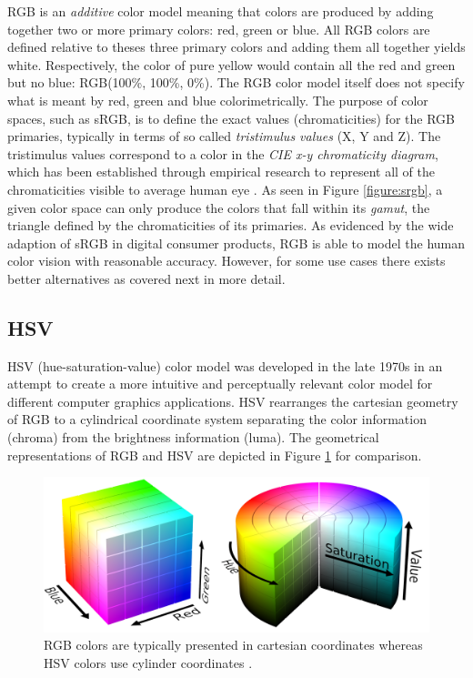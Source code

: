 \documentclass[thesis.tex]{subfiles}
\begin{document}
RGB is an \textit{additive} color model meaning that colors are produced by adding together two or more primary colors: red, green or blue. All RGB colors are defined relative to theses three primary colors and adding them all together yields white. Respectively, the color of pure yellow would contain all the red and green but no blue: RGB(100\%, 100\%, 0\%). The RGB color model itself does not specify what is meant by red, green and blue colorimetrically. The purpose of color spaces, such as sRGB, is to define the exact values (chromaticities) for the RGB primaries, typically in terms of so called \textit{tristimulus values} (X, Y and Z). The tristimulus values correspond to a color in the \textit{CIE x-y chromaticity diagram}, which has been established through empirical research to represent all of the chromaticities visible to average human eye \cite{cie}. As seen in Figure \ref{figure:srgb}, a given color space can only produce the colors that fall within its \textit{gamut}, the triangle defined by the chromaticities of its primaries. As evidenced by the wide adaption of sRGB in digital consumer products, RGB is able to model the human color vision with reasonable accuracy. However, for some use cases there exists better alternatives as covered next in more detail.



\subsection{HSV}

HSV (hue-saturation-value) color model was developed in the late 1970s in an attempt to create a more intuitive and perceptually relevant color model for different computer graphics applications. HSV rearranges the cartesian geometry of RGB to a cylindrical coordinate system separating the color information (chroma) from the brightness information (luma). The geometrical representations of RGB and HSV are depicted in Figure \ref{figure:rgb_hsv} for comparison.

\begin{figure}[hb]
\centering \includegraphics[width=\textwidth]{images/rgb_hsv}
\caption{RGB colors are typically presented in cartesian coordinates whereas HSV colors use cylinder coordinates \cite{hsv_cylinder}\cite{rgb_cube}.\label{figure:rgb_hsv}}
\end{figure}
\end{document}
